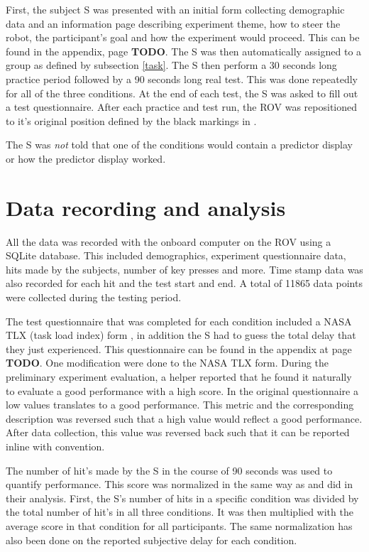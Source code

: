 First, the subject S was presented with an initial form collecting demographic data and an information page describing experiment theme, how to steer the robot, the participant's goal and how the experiment would proceed. This can be found in the appendix, page \textbf{TODO}. The S was then automatically assigned to a group as defined by subsection \ref{task}. The S then perform a 30 seconds long practice period followed by a 90 seconds long real test. This was done repeatedly for all of the three conditions. At the end of each test, the S was asked to fill out a test questionnaire.  After each practice and test run, the ROV was repositioned to it's original position defined by the black markings in .

The S was \emph{not} told that one of the conditions would contain a predictor display or how the predictor display worked.

\section{Data recording and analysis}

All the data was recorded with the onboard computer on the ROV using a SQLite database. This included demographics, experiment questionnaire data, hits made by the subjects, number of key presses and more. Time stamp data was also recorded for each hit and the test start and end. A total of 11865 data points were collected during the testing period.

The test questionnaire that was completed for each condition included a NASA TLX (task load index) form \citep{Hart1988}, in addition the S had to guess the total delay that they just experienced. This questionnaire can be found in the appendix at page \textbf{TODO}. One modification were done to the NASA TLX form. During the preliminary experiment evaluation, a helper reported that he found it naturally to evaluate a good performance with a high score. In the original questionnaire a low values translates to a good performance. This metric and the corresponding description was reversed such that a high value would reflect a good performance. After data collection, this value was reversed back such that it can be reported inline with convention.

The number of hit's made by the S in the course of 90 seconds was used to quantify performance. This score was normalized in the same way as \citep{Rachmielowski2010} and \citep{Lovi2014} did in their analysis. First, the S's number of hits in a specific condition was divided by the total number of hit's in all three conditions. It was then multiplied with the average score in that condition for all participants. The same normalization has also been done on the reported subjective delay for each condition.

